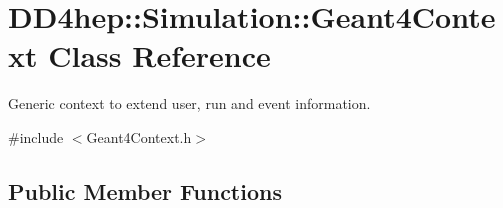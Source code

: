\hypertarget{class_d_d4hep_1_1_simulation_1_1_geant4_context}{}\section{D\+D4hep\+:\+:Simulation\+:\+:Geant4\+Context Class Reference}
\label{class_d_d4hep_1_1_simulation_1_1_geant4_context}


Generic context to extend user, run and event information.  




{\ttfamily \#include $<$Geant4\+Context.\+h$>$}

\subsection*{Public Member Functions}
